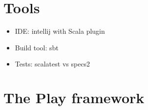 \documentclass[10pt]{beamer}
\providecommand{\eg}{e.\,g.}
\begin{document}








\section{Tools}

\begin{frame}
\begin{itemize}
\item IDE: intellij with Scala plugin
\item Build tool: sbt
\item Tests: scalatest vs specs2
\end{itemize}
\end{frame}

\section{The Play framework}
\end{document}
